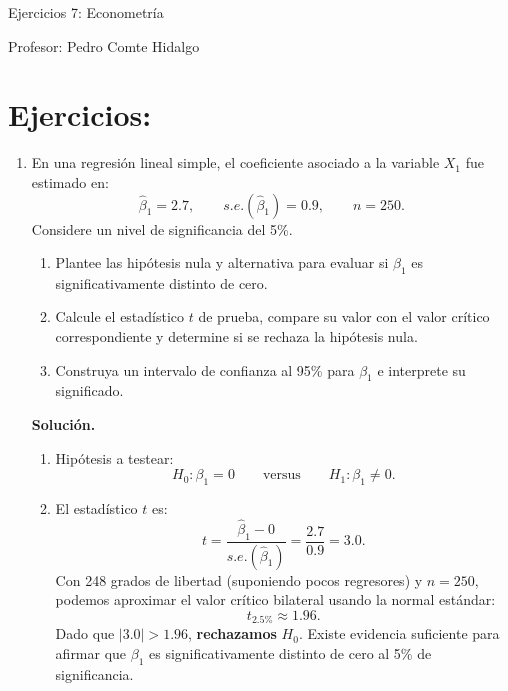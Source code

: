 \documentclass[10pt,a4paper]{article}
\begin{document}
\vspace{5cm}

\begin{center}
    {\Large  Ejercicios 7: Econometría }

Profesor:    Pedro Comte Hidalgo
\end{center}



\section{Ejercicios:}


\begin{enumerate}
    \item En una regresión lineal simple, el coeficiente asociado a la variable
        \(X_1\) fue estimado en:
        \[
          \hat\beta_1 = 2.7,
          \qquad s.e.(\hat\beta_1) = 0.9,
          \qquad n = 250.
        \]
        Considere un nivel de significancia del 5\%.

        \begin{enumerate}[label=\alph*)]
          \item Plantee las hipótesis nula y alternativa para evaluar si
                \( \beta_1 \) es significativamente distinto de cero.
          \item Calcule el estadístico \( t \) de prueba, compare su valor
                con el valor crítico correspondiente y determine si se
                rechaza la hipótesis nula.
          \item Construya un intervalo de confianza al 95\% para
                \( \beta_1 \) e interprete su significado.
        \end{enumerate}

        \textbf{Solución.}
        \begin{enumerate}[label=\alph*)]
          \item Hipótesis a testear:
                \[
                  H_0: \beta_1 = 0
                  \qquad\text{versus}\qquad
                  H_1: \beta_1 \neq 0.
                \]
          \item El estadístico \( t \) es:
                \[
                  t
                  = \frac{\hat\beta_1 - 0}{s.e.(\hat\beta_1)}
                  = \frac{2.7}{0.9}
                  = 3.0.
                \]
                Con 248 grados de libertad (suponiendo pocos regresores)
                y \(n = 250\), podemos aproximar el valor crítico bilateral
                usando la normal estándar:
                \[
                  t_{2.5\%} \approx 1.96.
                \]
                Dado que \(|3.0| > 1.96\), \textbf{rechazamos} \( H_0 \).
                Existe evidencia suficiente para afirmar que \( \beta_1 \) es
                significativamente distinto de cero al 5\% de significancia.


\end{enumerate}
\end{enumerate}
\end{document}
